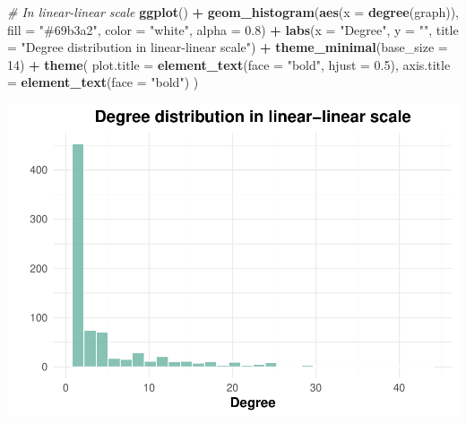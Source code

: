 \documentclass[
]{article}
\newenvironment{Shaded}{\begin{snugshade}}{\end{snugshade}}
\newcommand{\AttributeTok}[1]{\textcolor[rgb]{0.13,0.29,0.53}{#1}}
\newcommand{\CommentTok}[1]{\textcolor[rgb]{0.56,0.35,0.01}{\textit{#1}}}
\newcommand{\DecValTok}[1]{\textcolor[rgb]{0.00,0.00,0.81}{#1}}
\newcommand{\FloatTok}[1]{\textcolor[rgb]{0.00,0.00,0.81}{#1}}
\newcommand{\FunctionTok}[1]{\textcolor[rgb]{0.13,0.29,0.53}{\textbf{#1}}}
\newcommand{\NormalTok}[1]{#1}
\newcommand{\SpecialCharTok}[1]{\textcolor[rgb]{0.81,0.36,0.00}{\textbf{#1}}}
\newcommand{\StringTok}[1]{\textcolor[rgb]{0.31,0.60,0.02}{#1}}
\begin{document}
\begin{Shaded}
\begin{Highlighting}[]
\CommentTok{\# In linear{-}linear scale}
\FunctionTok{ggplot}\NormalTok{() }\SpecialCharTok{+} 
  \FunctionTok{geom\_histogram}\NormalTok{(}\FunctionTok{aes}\NormalTok{(}\AttributeTok{x =} \FunctionTok{degree}\NormalTok{(graph)),}
                 \AttributeTok{fill =} \StringTok{"\#69b3a2"}\NormalTok{, }\AttributeTok{color =} \StringTok{"white"}\NormalTok{, }\AttributeTok{alpha =} \FloatTok{0.8}\NormalTok{) }\SpecialCharTok{+} 
  \FunctionTok{labs}\NormalTok{(}\AttributeTok{x =} \StringTok{"Degree"}\NormalTok{, }
       \AttributeTok{y =} \StringTok{""}\NormalTok{, }
       \AttributeTok{title =} \StringTok{"Degree distribution in linear{-}linear scale"}\NormalTok{) }\SpecialCharTok{+}
  \FunctionTok{theme\_minimal}\NormalTok{(}\AttributeTok{base\_size =} \DecValTok{14}\NormalTok{) }\SpecialCharTok{+}
  \FunctionTok{theme}\NormalTok{(}
    \AttributeTok{plot.title =} \FunctionTok{element\_text}\NormalTok{(}\AttributeTok{face =} \StringTok{"bold"}\NormalTok{, }\AttributeTok{hjust =} \FloatTok{0.5}\NormalTok{),}
    \AttributeTok{axis.title =} \FunctionTok{element\_text}\NormalTok{(}\AttributeTok{face =} \StringTok{"bold"}\NormalTok{)}
\NormalTok{  )}
\end{Highlighting}
\end{Shaded}

\includegraphics{export-network_files/figure-latex/unnamed-chunk-9-1.pdf}
\end{document}
